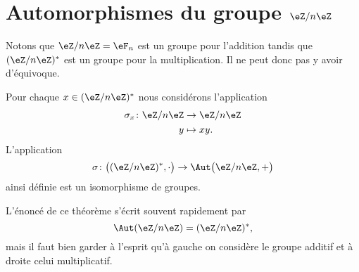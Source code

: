 \section{Automorphismes du groupe \texorpdfstring{$ \eZ/n\eZ$}{Z/nZ}}

Notons que \( \eZ/n\eZ=\eF_n\) est un groupe pour l'addition tandis que \( (\eZ/n\eZ)^*\) est un groupe pour la multiplication. Il ne peut donc pas y avoir d'équivoque.

\begin{theorem}   \label{ThoozyeSn}
    Pour chaque \( x\in (\eZ/n\eZ)^*\) nous considérons l'application
    \begin{equation}
        \begin{aligned}
            \sigma_x\colon \eZ/n\eZ&\to \eZ/n\eZ \\
            y&\mapsto xy.
        \end{aligned}
    \end{equation}
    L'application
    \begin{equation}
        \sigma\colon \big( (\eZ/n\eZ)^*,\cdot\big)\to \Aut\big( \eZ/n\eZ,+ \big)
    \end{equation}
    ainsi définie est un isomorphisme de groupes.
\end{theorem}
L'énoncé de ce théorème s'écrit souvent rapidement par
\begin{equation}
    \Aut(\eZ/n\eZ)=(\eZ/n\eZ)^*,
\end{equation}
mais il faut bien garder à l'esprit qu'à gauche on considère le groupe additif et à droite celui multiplicatif.

